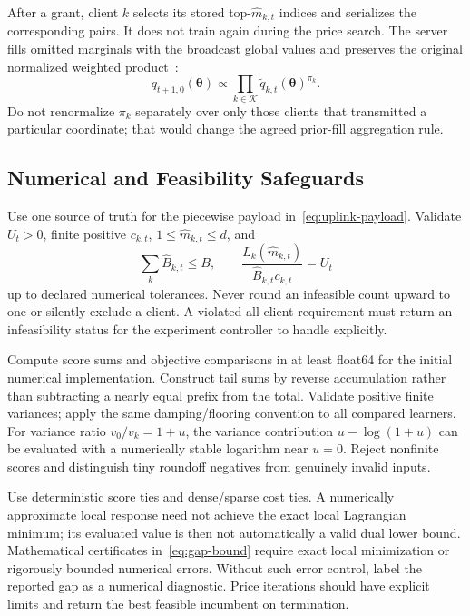 After a grant, client $k$ selects its stored top-$\widehat m_{k,t}$ indices and serializes the corresponding pairs. It does not train again during the price search. The server fills omitted marginals with the broadcast global values and preserves the original normalized weighted product~\cite[Sec.~II-A]{fedkls}:
\begin{equation}
 q_{t+1,0}(\boldsymbol\theta)
 \propto\prod_{k\in\mathcal K}
 \widetilde q_{k,t}(\boldsymbol\theta)^{\pi_k}.
 \label{eq:aggregation}
\end{equation}
Do not renormalize $\pi_k$ separately over only those clients that transmitted a particular coordinate; that would change the agreed prior-fill aggregation rule.

\subsection{Numerical and Feasibility Safeguards}
Use one source of truth for the piecewise payload in~\eqref{eq:uplink-payload}. Validate $U_t>0$, finite positive $c_{k,t}$, $1\le\widehat m_{k,t}\le d$, and
\begin{equation}
 \sum_k\widehat B_{k,t}\le B,\qquad
 \frac{L_k(\widehat m_{k,t})}{\widehat B_{k,t}c_{k,t}}=U_t
 \label{eq:postconditions}
\end{equation}
up to declared numerical tolerances. Never round an infeasible count upward to one or silently exclude a client. A violated all-client requirement must return an infeasibility status for the experiment controller to handle explicitly.

Compute score sums and objective comparisons in at least float64 for the initial numerical implementation. Construct tail sums by reverse accumulation rather than subtracting a nearly equal prefix from the total. Validate positive finite variances; apply the same damping/flooring convention to all compared learners. For variance ratio $v_0/v_k=1+u$, the variance contribution $u-\log(1+u)$ can be evaluated with a numerically stable logarithm near $u=0$. Reject nonfinite scores and distinguish tiny roundoff negatives from genuinely invalid inputs.

Use deterministic score ties and dense/sparse cost ties. A numerically approximate local response need not achieve the exact local Lagrangian minimum; its evaluated value is then not automatically a valid dual lower bound. Mathematical certificates in~\eqref{eq:gap-bound} require exact local minimization or rigorously bounded numerical errors. Without such error control, label the reported gap as a numerical diagnostic. Price iterations should have explicit limits and return the best feasible incumbent on termination.


